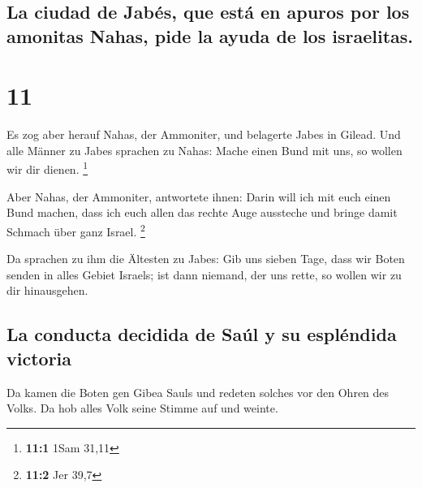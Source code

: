 \hypertarget{la-ciudad-de-jabuxe9s-que-estuxe1-en-apuros-por-los-amonitas-nahas-pide-la-ayuda-de-los-israelitas.}{%
\subsection{La ciudad de Jabés, que está en apuros por los amonitas
Nahas, pide la ayuda de los
israelitas.}\label{la-ciudad-de-jabuxe9s-que-estuxe1-en-apuros-por-los-amonitas-nahas-pide-la-ayuda-de-los-israelitas.}}

\hypertarget{section-10}{%
\section{11}\label{section-10}}

 Es zog aber herauf Nahas, der Ammoniter, und belagerte
Jabes in Gilead. Und alle Männer zu Jabes sprachen zu Nahas: Mache einen
Bund mit uns, so wollen wir dir dienen. \footnote{\textbf{11:1} 1Sam
  31,11}

 Aber Nahas, der Ammoniter, antwortete ihnen: Darin will
ich mit euch einen Bund machen, dass ich euch allen das rechte Auge
aussteche und bringe damit Schmach über ganz Israel. \footnote{\textbf{11:2}
  Jer 39,7}

 Da sprachen zu ihm die Ältesten zu Jabes: Gib uns sieben
Tage, dass wir Boten senden in alles Gebiet Israels; ist dann niemand,
der uns rette, so wollen wir zu dir hinausgehen.

\hypertarget{la-conducta-decidida-de-sauxfal-y-su-espluxe9ndida-victoria}{%
\subsection{La conducta decidida de Saúl y su espléndida
victoria}\label{la-conducta-decidida-de-sauxfal-y-su-espluxe9ndida-victoria}}

 Da kamen die Boten gen Gibea Sauls und redeten solches
vor den Ohren des Volks. Da hob alles Volk seine Stimme auf und weinte.

